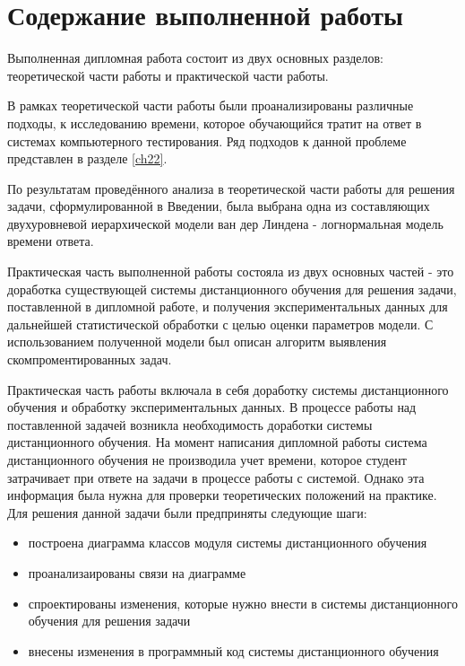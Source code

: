 \section{Содержание выполненной работы}

Выполненная дипломная работа состоит из двух основных разделов: тео\-ретической части работы и практической части работы.

В рамках теоретической части работы были проанализированы различные подходы, к исследованию времени, которое обучающийся тратит на ответ в системах компьютерного тестирования. Ряд подходов к данной проблеме  представлен в разделе \ref{ch22}. 

По результатам проведённого анализа в теоретической части работы для решения задачи, сформулированной в Введении, была выбрана одна из сос\-тавляющих двухуровневой иерархической модели ван дер Линдена - логнор\-мальная модель времени ответа.

Практическая часть выполненной работы состояла из двух основных час\-тей - это доработка существующей системы дистанционного обучения для решения задачи, постав\-ленной в дипломной работе, и получения эксперимен\-тальных данных для дальнейшей статистической обработки с целью оценки параметров модели. С использованием полученной модели был описан алго\-ритм выявления скомпроментированных задач.

Практическая часть работы включала в себя доработку системы дистан\-ционного обучения и обработку экспериментальных данных. В процессе ра\-боты над поставленной задачей возникла необходимость доработки сис\-темы дистанционного обучения. На момент написания дип\-ломной работы система дистан\-ционного обучения не производила учет вре\-мени, которое студент за\-трачивает при ответе на задачи в процессе работы с сис\-темой. Однако эта информация была нужна для проверки теоретических положений на практике. Для решения данной задачи были предприняты следующие шаги:

\begin{itemize}
\item построена диаграмма классов модуля системы дистанционного обучения
\item проанализаированы связи на диаграмме
\item спроектированы изменения, которые нужно внести в системы дистан\-ционного обуче\-ния для решения задачи
\item внесены изменения в программный код системы дистанционного обу\-чения
\end{itemize}

